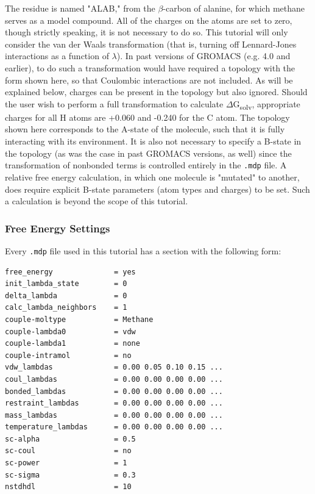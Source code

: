 \documentclass[9pt,tutorial]{livecoms}
\begin{document}
The residue is named "ALAB," from the $\beta$-carbon of alanine, for which methane serves as a model compound. All of the charges on the atoms are set to zero, though strictly speaking, it is not necessary to do so. This tutorial will only consider the van der Waals transformation (that is, turning off Lennard-Jones interactions as a function of $\lambda$). In past versions of GROMACS (e.g. 4.0 and earlier), to do such a transformation would have required a topology with the form shown here, so that Coulombic interactions are not included. As will be explained below, charges can be present in the topology but also ignored. Should the user wish to perform a full transformation to calculate $\Delta$G\textsubscript{solv}, appropriate charges for all H atoms are +0.060 and -0.240 for the C atom. The topology shown here corresponds to the A-state of the molecule, such that it is fully interacting with its environment. It is also not necessary to specify a B-state in the topology (as was the case in past GROMACS versions, as well) since the transformation of nonbonded terms is controlled entirely in the \texttt{.mdp} file. A relative free energy calculation, in which one molecule is "mutated" to another, does require explicit B-state parameters (atom types and charges) to be set. Such a calculation is beyond the scope of this tutorial.

\subsubsection{Free Energy Settings} \label{fes_settings}

Every \texttt{.mdp} file used in this tutorial has a section with the following form:

\begin{verbatim}
free_energy              = yes
init_lambda_state        = 0
delta_lambda             = 0
calc_lambda_neighbors    = 1
couple-moltype           = Methane
couple-lambda0           = vdw
couple-lambda1           = none
couple-intramol          = no
vdw_lambdas              = 0.00 0.05 0.10 0.15 ...
coul_lambdas             = 0.00 0.00 0.00 0.00 ...
bonded_lambdas           = 0.00 0.00 0.00 0.00 ...
restraint_lambdas        = 0.00 0.00 0.00 0.00 ...
mass_lambdas             = 0.00 0.00 0.00 0.00 ...
temperature_lambdas      = 0.00 0.00 0.00 0.00 ...
sc-alpha                 = 0.5
sc-coul                  = no
sc-power                 = 1
sc-sigma                 = 0.3
nstdhdl                  = 10
\end{verbatim}
\end{document}
